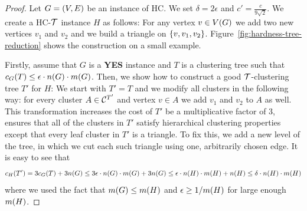 \begin{proof}
    Let $G=\mathopen{}\left( V,E \right)$ be an instance of \textsc{HC}. We set $\delta = 2\epsilon$ and $c'= \frac{c}{9\sqrt{2}}$. We create a \textsc{HC-$\mathcal{T}$} instance $H$ as follows: For any vertex $v\in V\mathopen{}\left( G \right)$ we add two new vertices $v_1$ and $v_2$ and we build a triangle on $\mathopen{}\left\{ v,v_1,v_2 \right\}$. 
    Figure~\ref{fig:hardness-tree-reduction} shows the construction on a small example.

    
    
    Firstly, assume that $G$ is a \textbf{YES} instance and $T$ is a clustering tree such that ${c}_G\mathopen{}\left( T \right)\leq \epsilon \cdot n\mathopen{}\left( G \right) \cdot m\mathopen{}\left( G \right)$. Then, we show how to construct a good $\mathcal{T}$-clustering tree $T'$ for $H$: We start with $T'=T$ and we modify all clusters in the following way: for every cluster $A\in \mathcal{C}^{T'}$ and vertex $v\in A$ we add $v_1$ and $v_2$ to $A$ as well. This transformation increases the cost of $T'$ be a multiplicative factor of $3$, ensures that all of the clusters in $T'$ satisfy hierarchical clustering properties except that every leaf cluster in $T'$ is a triangle. To fix this, we add a new level of the tree, in which we cut each such triangle using one, arbitrarily chosen edge. It is easy to see that
    \[
    {c}_H\mathopen{}\left( T' \right) = 3{c}_G\mathopen{}\left( T \right)+ 3n\mathopen{}\left( G \right) \leq 3\epsilon \cdot n\mathopen{}\left( G \right) \cdot m\mathopen{}\left( G \right) + 3n\mathopen{}\left( G \right) \leq \epsilon \cdot n\mathopen{}\left( H \right) \cdot m\mathopen{}\left( H \right)+n\mathopen{}\left( H \right)\leq \delta \cdot n\mathopen{}\left( H \right) \cdot m\mathopen{}\left( H \right)
    \]
    where we used the fact that $m\mathopen{}\left( G \right)\leq m\mathopen{}\left( H \right)$ and $\epsilon \geq 1/m\mathopen{}\left( H \right)$ for large enough $m\mathopen{}\left( H \right)$.
    

\end{proof}
